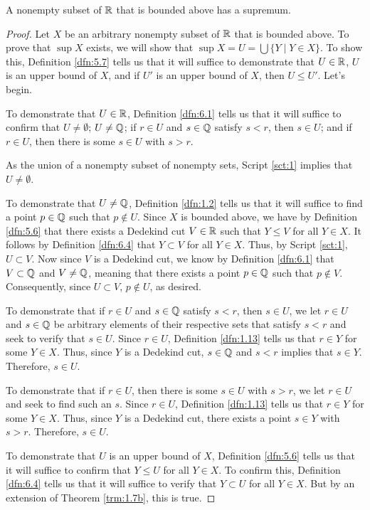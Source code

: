 \documentclass[../main.tex]{subfiles}
\begin{document}
\begin{lemma}\label{lem:6.6}
    A nonempty subset of $\mathbb{R}$ that is bounded above has a supremum.
    \begin{proof}
        Let $X$ be an arbitrary nonempty subset of $\mathbb{R}$ that is bounded above. To prove that $\sup X$ exists, we will show that $\sup X=U=\bigcup\{Y\mid Y\in X\}$. To show this, Definition \ref{dfn:5.7} tells us that it will suffice to demonstrate that $U\in\mathbb{R}$, $U$ is an upper bound of $X$, and if $U'$ is an upper bound of $X$, then $U\leq U'$. Let's begin.\par\smallskip
        To demonstrate that $U\in\mathbb{R}$, Definition \ref{dfn:6.1} tells us that it will suffice to confirm that $U\neq\emptyset$; $U\neq\mathbb{Q}$; if $r\in U$ and $s\in\mathbb{Q}$ satisfy $s<r$, then $s\in U$; and if $r\in U$, then there is some $s\in U$ with $s>r$.\par
        As the union of a nonempty subset of nonempty sets, Script \ref{sct:1} implies that $U\neq\emptyset$.\par
        To demonstrate that $U\neq\mathbb{Q}$, Definition \ref{dfn:1.2} tells us that it will suffice to find a point $p\in\mathbb{Q}$ such that $p\notin U$. Since $X$ is bounded above, we have by Definition \ref{dfn:5.6} that there exists a Dedekind cut $V\in\mathbb{R}$ such that $Y\leq V$ for all $Y\in X$. It follows by Definition \ref{dfn:6.4} that $Y\subset V$ for all $Y\in X$. Thus, by Script \ref{sct:1}, $U\subset V$. Now since $V$ is a Dedekind cut, we know by Definition \ref{dfn:6.1} that $V\subset\mathbb{Q}$ and $V\neq\mathbb{Q}$, meaning that there exists a point $p\in\mathbb{Q}$ such that $p\notin V$. Consequently, since $U\subset V$, $p\notin U$, as desired.\par
        To demonstrate that if $r\in U$ and $s\in\mathbb{Q}$ satisfy $s<r$, then $s\in U$, we let $r\in U$ and $s\in\mathbb{Q}$ be arbitrary elements of their respective sets that satisfy $s<r$ and seek to verify that $s\in U$. Since $r\in U$, Definition \ref{dfn:1.13} tells us that $r\in Y$ for some $Y\in X$. Thus, since $Y$ is a Dedekind cut, $s\in\mathbb{Q}$ and $s<r$ implies that $s\in Y$. Therefore, $s\in U$.\par
        To demonstrate that if $r\in U$, then there is some $s\in U$ with $s>r$, we let $r\in U$ and seek to find such an $s$. Since $r\in U$, Definition \ref{dfn:1.13} tells us that $r\in Y$ for some $Y\in X$. Thus, since $Y$ is a Dedekind cut, there exists a point $s\in Y$ with $s>r$. Therefore, $s\in U$.\par\smallskip
        To demonstrate that $U$ is an upper bound of $X$, Definition \ref{dfn:5.6} tells us that it will suffice to confirm that $Y\leq U$ for all $Y\in X$. To confirm this, Definition \ref{dfn:6.4} tells us that it will suffice to verify that $Y\subset U$ for all $Y\in X$. But by an extension of Theorem \ref{trm:1.7b}, this is true.\par\smallskip

\end{proof}
\end{lemma}
\end{document}
